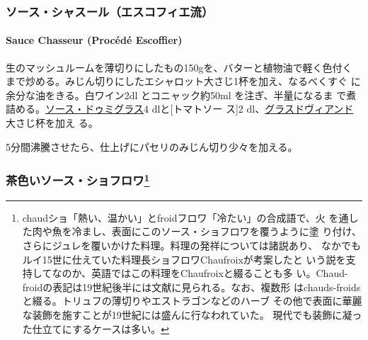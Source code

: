 \maeaki

\hypertarget{ux30bdux30fcux30b9ux30b7ux30e3ux30b9ux30fcux30ebux30a8ux30b9ux30b3ux30d5ux30a3ux30a8ux6d41}{%
\subsubsection{ソース・シャスール（エスコフィエ流）}\label{ux30bdux30fcux30b9ux30b7ux30e3ux30b9ux30fcux30ebux30a8ux30b9ux30b3ux30d5ux30a3ux30a8ux6d41}}

\hypertarget{sauce-chasseur-procede-escoffier}{%
\paragraph{Sauce Chasseur (Procédé
Escoffier)}\label{sauce-chasseur-procede-escoffier}}

   

生のマッシュルームを薄切りにしたもの150gを、バターと植物油で軽く色付く
まで炒める。みじん切りにしたエシャロット大さじ1杯を加え、なるべくすぐ
に余分な油をきる。白ワイン2dl とコニャック約50ml を注ぎ、半量になるま
で煮詰める。\protect\hyperlink{sauce-demi-glace}{ソース・ドゥミグラス}4
dlと{[}トマトソー ス{]}2
dl、\protect\hyperlink{glace-de-viande}{グラスドヴィアンド}大さじ\undemi{}杯を加え
る。

5分間沸騰させたら、仕上げにパセリのみじん切り少々を加える。

\maeaki

\hypertarget{ux8336ux8272ux3044ux30bdux30fcux30b9ux30b7ux30e7ux30d5ux30edux30ef15}{%
\subsubsection[茶色いソース・ショフロワ]{\texorpdfstring{茶色いソース・ショフロワ\footnote{chaudショ「熱い、温かい」とfroidフロワ「冷たい」の合成語で、火
  を通した肉や魚を冷まし、表面にこのソース・ショフロワを覆うように塗
  り付け、さらにジュレを覆いかけた料理。料理の発祥については諸説あり、
  なかでもルイ15世に仕えていた料理長ショフロワChaufroixが考案したと
  いう説を支持してなのか、英語ではこの料理をChaufroixと綴ることも多
  い。Chaud-froidの表記は19世紀後半には文献に見られる。なお、複数形
  はchauds-froidsと綴る。トリュフの薄切りやエストラゴンなどのハーブ
  その他で表面に華麗な装飾を施すことが19世紀には盛んに行なわれていた。
  現代でも装飾に凝った仕立てにするケースは多い。}}{茶色いソース・ショフロワ}}\label{ux8336ux8272ux3044ux30bdux30fcux30b9ux30b7ux30e7ux30d5ux30edux30ef15}}

